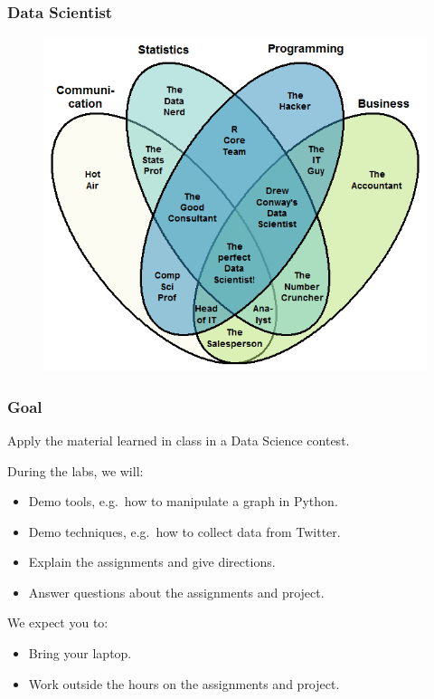 \documentclass{beamer}
\begin{document}
\begin{frame}
	\frametitle{Data Scientist}
	\begin{figure}
		\includegraphics[height=0.8\textheight]{data_scientist}
	\end{figure}
\end{frame}


\begin{frame}
	\frametitle{Goal}
	\begin{center}
		Apply the material learned in class in a Data Science contest.
	\end{center}
	\vfill
	During the labs, we will:
	\begin{itemize}
		\item Demo tools, e.g.\ how to manipulate a graph in Python.
		\item Demo techniques, e.g.\ how to collect data from Twitter.
		\item Explain the assignments and give directions.
		\item Answer questions about the assignments and project.
	\end{itemize}
	\vfill
	We expect you to:
	\begin{itemize}
		\item Bring your laptop.
		\item Work outside the hours on the assignments and project.
	\end{itemize}
\end{frame}
\end{document}
